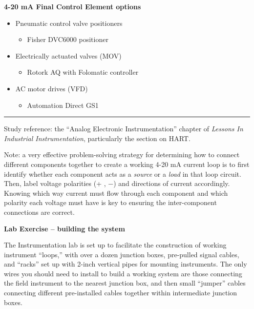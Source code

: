 \begin{itemize}
{{{{\noindent \centerline{\bf 4-20 mA Final Control Element options}
\begin{itemize}
\item{} Pneumatic control valve positioners
\begin{itemize}

\item{} Fisher DVC6000 positioner 
\end{itemize}
\vskip 2pt
\item{} Electrically actuated valves (MOV)
\begin{itemize}

\item{} Rotork AQ with Folomatic controller 
\end{itemize}
\vskip 2pt
\item{} AC motor drives (VFD)
\begin{itemize}

\item{} Automation Direct GS1 
\end{itemize}
\end{itemize}

} \hskip 3pt}%
\vskip 5pt \hrule}%
\vrule}


\vfil

Study reference: the ``Analog Electronic Instrumentation'' chapter of {\it Lessons In Industrial Instrumentation}, particularly the section on HART.

\vskip 10pt

Note: a very effective problem-solving strategy for determining how to connect different components together to create a working 4-20 mA current loop is to first identify whether each component acts as a {\it source} or a {\it load} in that loop circuit.  Then, label voltage polarities (+ , $-$) and directions of current accordingly.  Knowing which way current must flow through each component and which polarity each voltage must have is key to ensuring the inter-component connections are correct.







\vfil \eject

\noindent
{\bf Lab Exercise -- building the system}

\vskip 5pt

The Instrumentation lab is set up to facilitate the construction of working instrument ``loops,'' with over a dozen junction boxes, pre-pulled signal cables, and ``racks'' set up with 2-inch vertical pipes for mounting instruments.  The only wires you should need to install to build a working system are those connecting the field instrument to the nearest junction box, and then small ``jumper'' cables connecting different pre-installed cables together within intermediate junction boxes.


\end{itemize}
